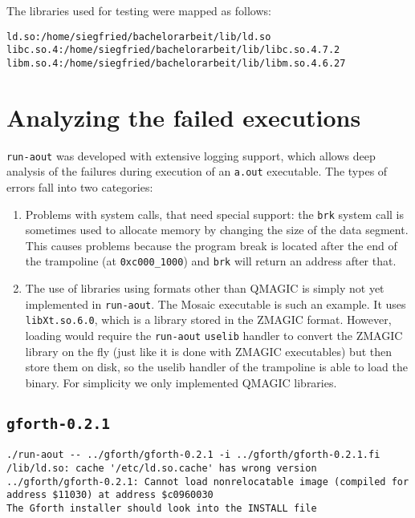 \documentclass[draft,final]{vutinfth} %
\begin{document}
The libraries used for testing were mapped as follows:

\begin{lstlisting}[caption={Contents of uselib.conf}]
ld.so:/home/siegfried/bachelorarbeit/lib/ld.so
libc.so.4:/home/siegfried/bachelorarbeit/lib/libc.so.4.7.2
libm.so.4:/home/siegfried/bachelorarbeit/lib/libm.so.4.6.27
\end{lstlisting}

\section{Analyzing the failed executions}

\texttt{run-aout} was developed with extensive logging support, which allows deep analysis of the failures during execution of an \texttt{a.out} executable. The types of errors fall into two categories:

\begin{enumerate}
    \item Problems with system calls, that need special support: the \texttt{brk} system call is sometimes used to allocate memory by changing the size of the data segment. This causes problems because the program break is located after the end of the trampoline (at \texttt{0xc000\_1000}) and \texttt{brk} will return an address after that.
    
    \item The use of libraries using formats other than QMAGIC is simply not yet implemented in \texttt{run-aout}. The Mosaic executable is such an example. It uses \texttt{libXt.so.6.0}, which is a library stored in the ZMAGIC format. However, loading would require the \texttt{run-aout} \texttt{uselib} handler to convert the ZMAGIC library on the fly (just like it is done with ZMAGIC executables) but then store them on disk, so the uselib handler of the trampoline is able to load the binary. For simplicity we only implemented QMAGIC libraries.
\end{enumerate}

\subsection{\texttt{gforth-0.2.1}}

\begin{lstlisting}[caption={Output produced by \texttt{gforth 0.2.1}}]
./run-aout -- ../gforth/gforth-0.2.1 -i ../gforth/gforth-0.2.1.fi
/lib/ld.so: cache '/etc/ld.so.cache' has wrong version
../gforth/gforth-0.2.1: Cannot load nonrelocatable image (compiled for address $11030) at address $c0960030
The Gforth installer should look into the INSTALL file
\end{lstlisting}
\end{document}
